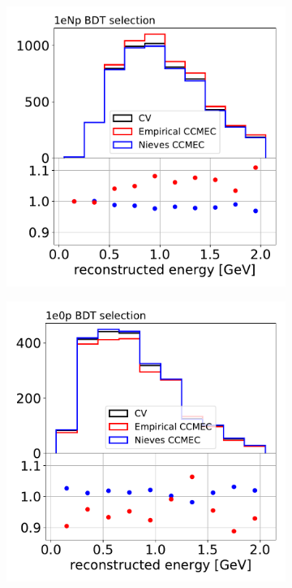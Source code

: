 \begin{figure}[H] 
    \begin{center}
    \begin{subfigure}[b]{0.3\textwidth}
    \includegraphics[width=1.00\textwidth]{Systematics/systvariations/1eNp_CCMEC.pdf}
    \end{subfigure}
    \begin{subfigure}[b]{0.3\textwidth}
    \includegraphics[width=1.00\textwidth]{Systematics/systvariations/1e0p_CCMEC.pdf}

\end{subfigure}
\end{center}
\end{figure}
